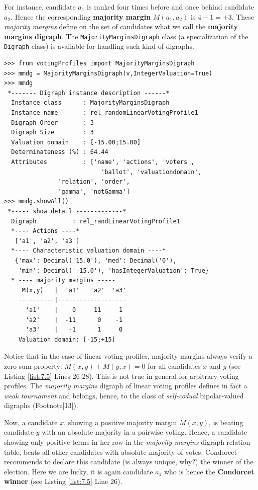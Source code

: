 For instance, candidate $a_1$ is ranked four times before and once behind candidate $a_2$. Hence the corresponding \textbf{majority margin} $M(a_1,a_2)$ is $4 - 1 = +3$. These \emph{majority margins} define on the set of candidates what we call the \textbf{majority margins digraph}. The \texttt{MajorityMarginsDigraph} class (a specialization of the \texttt{Digraph} class) is available for handling such kind of digraphs.

\begin{lstlisting}[caption={Example of \emph{Majority Margins} digraph},label=list:7.5,basicstyle=\footnotesize]
>>> from votingProfiles import MajorityMarginsDigraph
>>> mmdg = MajorityMarginsDigraph(v,IntegerValuation=True)
>>> mmdg
 *------- Digraph instance description ------*
  Instance class      : MajorityMarginsDigraph
  Instance name       : rel_randomLinearVotingProfile1
  Digraph Order       : 3
  Digraph Size        : 3
  Valuation domain    : [-15.00;15.00]
  Determinateness (%) : 64.44
  Attributes          : ['name', 'actions', 'voters',
                           'ballot', 'valuationdomain',
			   'relation', 'order',
			   'gamma', 'notGamma']
>>> mmdg.showAll()
 *----- show detail -------------*
  Digraph          : rel_randLinearVotingProfile1
  *---- Actions ----*
   ['a1', 'a2', 'a3']
  *---- Characteristic valuation domain ----*
   {'max': Decimal('15.0'), 'med': Decimal('0'),
    'min': Decimal('-15.0'), 'hasIntegerValuation': True}
  * ---- majority margins -----
     M(x,y)   |  'a1'	'a2'  'a3'	  
    ----------|-------------------
      'a1'    |    0     11     1	 
      'a2'    |  -11      0    -1	 
      'a3'    |   -1      1     0	 
    Valuation domain: [-15;+15]
\end{lstlisting}

Notice that in the case of linear voting profiles, majority margins always verify a zero sum property: $M(x,y) + M(y,x) = 0$ for all candidates $x$ and $y$ (see Listing \ref{list:7.5} Lines 26-28). This is not true in general for arbitrary voting profiles. The \emph{majority margins} digraph of linear voting profiles defines in fact a \emph{weak tournament} and belongs, hence, to the class of \emph{self-codual} bipolar-valued digraphs (Footnote[13]).
    
Now, a candidate $x$, showing a positive majority margin $M(x,y)$, is beating candidate $y$  with an absolute majority in a pairwise voting. Hence, a candidate showing only positive terms in her row in the \emph{majority margins} digraph relation table, beats all other candidates with absolute majority of votes. Condorcet recommends to declare this candidate (is always unique, why?) the winner of the election. Here we are lucky, it is again candidate $a_1$ who is hence the \textbf{Condorcet winner} (see Listing \ref{list:7.5} Line 26).

